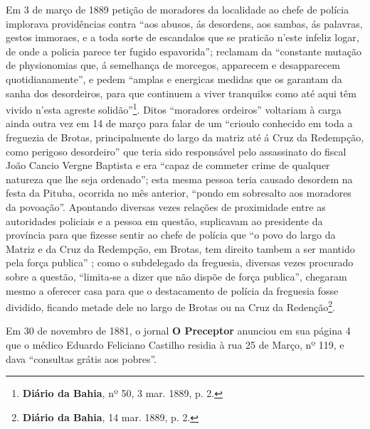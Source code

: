 Em 3 de março de 1889 petição de moradores da localidade ao chefe de polícia implorava providências contra ``aos abusos, ás desordens, aos sambas, ás palavras, gestos immoraes, e a toda sorte de escandalos que se praticão n'este infeliz logar, de onde a policia parece ter fugido espavorida''; reclamam da ``constante mutação de physionomias que, á semelhança de morcegos, apparecem e desapparecem quotidianamente'', e pedem ``amplas e energicas medidas que os garantam da sanha dos desordeiros, para que continuem a viver tranquilos como até aqui têm vivido n'esta agreste solidão''\footnote{\textbf{Diário da Bahia}, nº 50, 3 mar. 1889, p. 2.}. Ditos ``moradores ordeiros'' voltariam à carga ainda outra vez em 14 de março para falar de um ``crioulo conhecido em toda a freguezia de Brotas, principalmente do largo da matriz até á Cruz da Redempção, como perigoso desordeiro'' que teria sido responsável pelo assassinato do fiscal João Cancio Vergne Baptista e era ``capaz de commeter crime de qualquer natureza que lhe seja ordenado''; esta mesma pessoa teria causado desordem na festa da Pituba, ocorrida no mês anterior, ``pondo em sobresalto aos moradores da povoação''. Apontando diversas vezes relações de proximidade entre as autoridades policiais e a pessoa em questão, suplicavam ao presidente da província para que fizesse sentir ao chefe de polícia que ``o povo do largo da Matriz e da Cruz da Redempção, em Brotas, tem direito tambem a ser mantido pela força publica'' ; como o subdelegado da freguesia, diversas vezes procurado sobre a questão, ``limita-se a dizer que não dispõe de força publica'', chegaram mesmo a oferecer casa para que o destacamento de polícia da freguesia fosse dividido, ficando metade dele no largo de Brotas ou na Cruz da Redenção\footnote{\textbf{Diário da Bahia}, 14 mar. 1889, p. 2.}.


Em 30 de novembro de 1881, o jornal \textbf{O Preceptor} anunciou em sua página 4 que o médico Eduardo Feliciano Castilho residia à rua 25 de Março, nº 119, e dava ``consultas grátis aos pobres''.
